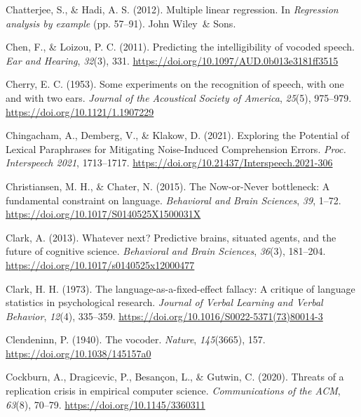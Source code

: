 \documentclass[a4paper, nobind]{templates/ociamthesis}
\newlength{\cslhangindent}
\newenvironment{CSLReferences}[2] %
 {%
  \setlength{\parindent}{0pt}
  \ifodd #1
  \let\oldpar\par
  \def\par{\hangindent=\cslhangindent\oldpar}
  \fi
  \setlength{\parskip}{1mm}
  \setlength{\baselineskip}{6mm}
 }%
 {}
\begin{document}
\begin{CSLReferences}{1}{0}
\leavevmode{}%
Chatterjee, S., \& Hadi, A. S. (2012). Multiple linear regression. In \emph{Regression analysis by example} (pp. 57--91). John Wiley~\& Sons.

\leavevmode{}%
Chen, F., \& Loizou, P. C. (2011). Predicting the intelligibility of vocoded speech. \emph{Ear and Hearing}, \emph{32}(3), 331. \url{https://doi.org/10.1097/AUD.0b013e3181ff3515}

\leavevmode{}%
Cherry, E. C. (1953). {Some experiments on the recognition of speech, with one and with two ears}. \emph{Journal of the Acoustical Society of America}, \emph{25}(5), 975--979. \url{https://doi.org/10.1121/1.1907229}

\leavevmode{}%
Chingacham, A., Demberg, V., \& Klakow, D. (2021). {Exploring the Potential of Lexical Paraphrases for Mitigating Noise-Induced Comprehension Errors}. \emph{Proc. Interspeech 2021}, 1713--1717. \url{https://doi.org/10.21437/Interspeech.2021-306}

\leavevmode{}%
Christiansen, M. H., \& Chater, N. (2015). {The Now-or-Never bottleneck: A fundamental constraint on language}. \emph{Behavioral and Brain Sciences}, \emph{39}, 1--72. \url{https://doi.org/10.1017/S0140525X1500031X}

\leavevmode{}%
Clark, A. (2013). Whatever next? Predictive brains, situated agents, and the future of cognitive science. \emph{Behavioral and Brain Sciences}, \emph{36}(3), 181--204. \url{https://doi.org/10.1017/s0140525x12000477}

\leavevmode{}%
Clark, H. H. (1973). {The language-as-a-fixed-effect fallacy: A critique of language statistics in psychological research}. \emph{Journal of Verbal Learning and Verbal Behavior}, \emph{12}(4), 335--359. \url{https://doi.org/10.1016/S0022-5371(73)80014-3}

\leavevmode{}%
Clendeninn, P. (1940). {The vocoder}. \emph{Nature}, \emph{145}(3665), 157. \url{https://doi.org/10.1038/145157a0}

\leavevmode{}%
Cockburn, A., Dragicevic, P., Besançon, L., \& Gutwin, C. (2020). {Threats of a replication crisis in empirical computer science}. \emph{Communications of the ACM}, \emph{63}(8), 70--79. \url{https://doi.org/10.1145/3360311}


\end{CSLReferences}
\end{document}
